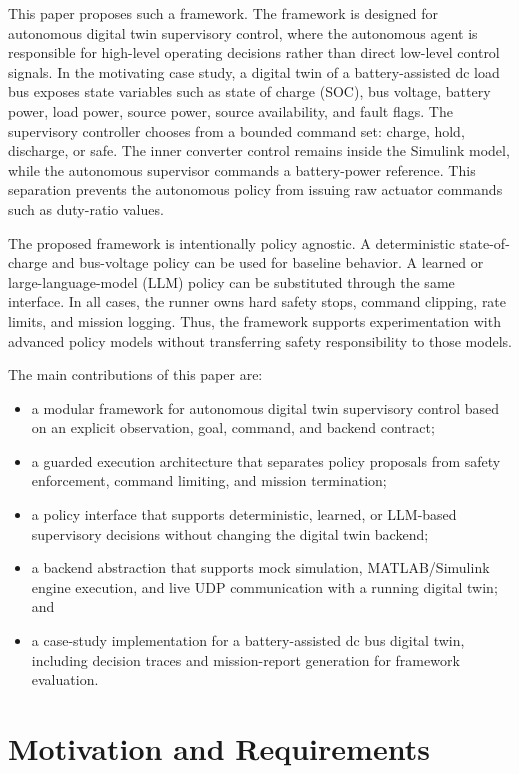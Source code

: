 \documentclass[conference]{IEEEtran}
\begin{document}
This paper proposes such a framework. The framework is designed for autonomous
digital twin supervisory control, where the autonomous agent is responsible
for high-level operating decisions rather than direct low-level control
signals. In the motivating case study, a digital twin of a battery-assisted dc
load bus exposes state variables such as state of charge (SOC), bus voltage,
battery power, load power, source power, source availability, and fault flags.
The supervisory controller chooses from a bounded command set: charge, hold,
discharge, or safe. The inner converter control remains inside the Simulink
model, while the autonomous supervisor commands a battery-power reference.
This separation prevents the autonomous policy from issuing raw actuator
commands such as duty-ratio values.

The proposed framework is intentionally policy agnostic. A deterministic
state-of-charge and bus-voltage policy can be used for baseline behavior. A
learned or large-language-model (LLM) policy can be substituted through the
same interface. In all cases, the runner owns hard safety stops, command
clipping, rate limits, and mission logging. Thus, the framework supports
experimentation with advanced policy models without transferring safety
responsibility to those models.

The main contributions of this paper are:
\begin{itemize}
    \item a modular framework for autonomous digital twin supervisory control
    based on an explicit observation, goal, command, and backend contract;
    \item a guarded execution architecture that separates policy proposals
    from safety enforcement, command limiting, and mission termination;
    \item a policy interface that supports deterministic, learned, or
    LLM-based supervisory decisions without changing the digital twin backend;
    \item a backend abstraction that supports mock simulation,
    MATLAB/Simulink engine execution, and live UDP communication with a
    running digital twin; and
    \item a case-study implementation for a battery-assisted dc bus digital
    twin, including decision traces and mission-report generation for
    framework evaluation.
\end{itemize}

\section{Motivation and Requirements}
\end{document}
